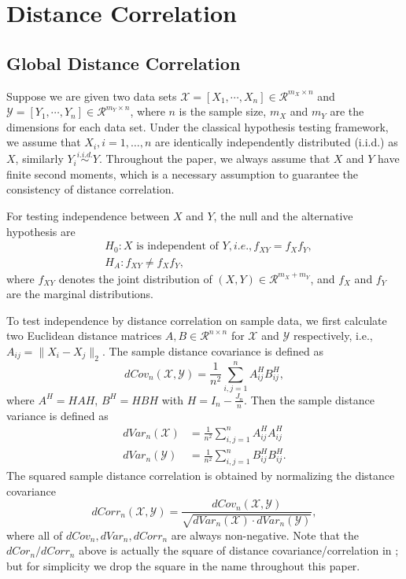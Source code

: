 \documentclass[11pt]{article}
\begin{document}
\appendix

\section{Distance Correlation}
\label{main}
\subsection{Global Distance Correlation}
\label{main1}
Suppose we are given two data sets $\mathcal{X}=[X_{1},\cdots, X_{n}] \in \mathcal{R}^{m_{X} \times n}$ and $\mathcal{Y}=[Y_{1},\cdots, Y_{n}] \in \mathcal{R}^{m_{Y} \times n}$, where $n$ is the sample size, $m_{X}$ and $m_{Y}$ are the dimensions for each data set. Under the classical hypothesis testing framework, we assume that $X_{i}, i=1,\ldots,n$ are identically independently distributed (i.i.d.) as $X$, similarly $Y_{i} \stackrel{i.i.d.}{\sim} Y$. Throughout the paper, we always assume that $X$ and $Y$ have finite second moments, which is a necessary assumption to guarantee the consistency of distance correlation.

For testing independence between $X$ and $Y$, the null and the alternative hypothesis are
\begin{align*}
& H_{0}: X \mbox{ is independent of } Y, i.e., f_{XY}=f_{X}f_{Y},\\
& H_{A}: f_{XY} \neq f_{X}f_{Y},
\end{align*}
where $f_{XY}$ denotes the joint distribution of $(X,Y) \in \mathcal{R}^{m_{X}+m_{Y}}$, and $f_{X}$ and $f_{Y}$ are the marginal distributions. 

To test independence by distance correlation on sample data, we first calculate two Euclidean distance matrices $A, B \in \mathcal{R}^{n \times n}$ for $\mathcal{X}$ and $\mathcal{Y}$ respectively, i.e., $A_{ij}=\|X_{i}-X_{j}\|_{2}$. The sample distance covariance is defined as
\begin{equation}
\label{dCovEqu}
dCov_{n}(\mathcal{X},\mathcal{Y})=\frac{1}{n^2}\sum_{i,j=1}^{n}A^{H}_{ij}B^{H}_{ij},
\end{equation}
where $A^{H}=HAH$, $B^{H}=HBH$ with $H=I_{n}-\frac{J_{n}}{n}$. Then the sample distance variance is defined as
\begin{align*}
dVar_{n}(\mathcal{X}) &=\frac{1}{n^2}\sum_{i,j=1}^{n}A^{H}_{ij}A^{H}_{ij}\\
dVar_{n}(\mathcal{Y}) &=\frac{1}{n^2}\sum_{i,j=1}^{n}B^{H}_{ij}B^{H}_{ij}.
\end{align*}
The squared sample distance correlation is obtained by normalizing the distance covariance
\begin{equation}
\label{dCorrEqu}
dCorr_{n}(\mathcal{X},\mathcal{Y})=\frac{dCov_{n}(\mathcal{X},\mathcal{Y})}{\sqrt{dVar_{n}(\mathcal{X}) \cdot dVar_{n}(\mathcal{Y})}},
\end{equation}
where all of $dCov_{n}, dVar_{n}, dCorr_{n}$ are always non-negative. Note that the $dCor_{n}/dCorr_{n}$ above is actually the square of distance covariance/correlation in \cite{SzekelyRizzoBakirov2007}; but for simplicity we drop the square in the name throughout this paper.
\end{document}
